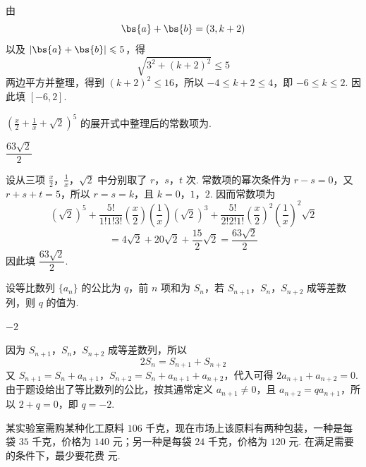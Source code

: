 \begin{solution}
由
\[
\bs{a}+\bs{b}=(3,k+2)
\]
以及 \(\lvert\bs{a}+\bs{b}\rvert\leqslant5\)，得
\[
\sqrt{3^2+(k+2)^2}\leqslant5
\]
两边平方并整理，得到 \((k+2)^2\leqslant16\)，所以 \(-4\leqslant k+2\leqslant4\)，即 \(-6\leqslant k\leqslant2\). 因此填 \([-6,2]\).
\end{solution}

\begin{problem}
\(\left(\frac{x}{2} + \frac{1}{x} + \sqrt{2}\right)^5\) 的展开式中整理后的常数项为\fillinblank{}.
\end{problem}

\begin{answer}
\(\dfrac{63\sqrt{2}}{2}\)
\end{answer}

\begin{solution}
设从三项 \(\frac{x}{2}\)，\(\frac1x\)，\(\sqrt2\) 中分别取了 \(r\)，\(s\)，\(t\) 次. 常数项的幂次条件为 \(r-s=0\)，又 \(r+s+t=5\)，所以 \(r=s=k\)，且 \(k=0\)，\(1\)，\(2\). 因而常数项为
\[
(\sqrt2)^5+\frac{5!}{1!1!3!}\left(\frac{x}{2}\right)\left(\frac1x\right)(\sqrt2)^3+\frac{5!}{2!2!1!}\left(\frac{x}{2}\right)^2\left(\frac1x\right)^2\sqrt2
\]
\[
=4\sqrt2+20\sqrt2+\frac{15}{2}\sqrt2=\frac{63\sqrt2}{2}
\]
因此填 \(\dfrac{63\sqrt2}{2}\).
\end{solution}

\begin{problem}
设等比数列 \(\{a_{n}\}\) 的公比为 \(q\)，前 \(n\) 项和为 \(S_{n}\)，若 \(S_{n+1}\)，\(S_{n}\)，\(S_{n+2}\) 成等差数列，则 \(q\) 的值为\fillinblank{}.
\end{problem}

\begin{answer}
\(-2\)
\end{answer}

\begin{solution}
因为 \(S_{n+1}\)，\(S_n\)，\(S_{n+2}\) 成等差数列，所以
\[
2S_n=S_{n+1}+S_{n+2}
\]
又 \(S_{n+1}=S_n+a_{n+1}\)，\(S_{n+2}=S_n+a_{n+1}+a_{n+2}\)，代入可得 \(2a_{n+1}+a_{n+2}=0\). 由于题设给出了等比数列的公比，按其通常定义 \(a_{n+1}\neq0\)，且 \(a_{n+2}=q a_{n+1}\)，所以 \(2+q=0\)，即 \(q=-2\).
\end{solution}

\begin{problem}
某实验室需购某种化工原料 \(106\text{ 千克}\)，现在市场上该原料有两种包装，一种是每袋 \(35\text{ 千克}\)，价格为 \(140\text{ 元}\)；另一种是每袋 \(24\text{ 千克}\)，价格为 \(120\text{ 元}\). 在满足需要的条件下，最少要花费\fillinblank{}\(\text{ 元}\).
\end{problem}

